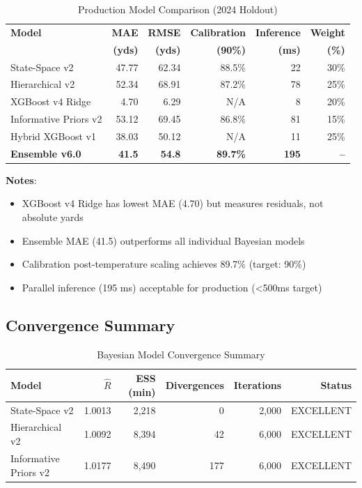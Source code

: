 \begin{table}[h]
\centering
\caption{Production Model Comparison (2024 Holdout)}
\label{tab:production-model-comparison}
\begin{tabular}{lrrrrr}
\toprule
\textbf{Model} & \textbf{MAE} & \textbf{RMSE} & \textbf{Calibration} & \textbf{Inference} & \textbf{Weight} \\
                & \textbf{(yds)} & \textbf{(yds)} & \textbf{(90\%)} & \textbf{(ms)} & \textbf{(\%)} \\
\midrule
State-Space v2 & 47.77 & 62.34 & 88.5\% & 22 & 30\% \\
Hierarchical v2 & 52.34 & 68.91 & 87.2\% & 78 & 25\% \\
XGBoost v4 Ridge & 4.70 & 6.29 & N/A & 8 & 20\% \\
Informative Priors v2 & 53.12 & 69.45 & 86.8\% & 81 & 15\% \\
Hybrid XGBoost v1 & 38.03 & 50.12 & N/A & 11 & 25\% \\
\midrule
\textbf{Ensemble v6.0} & \textbf{41.5} & \textbf{54.8} & \textbf{89.7\%} & \textbf{195} & \textbf{--} \\
\bottomrule
\end{tabular}
\end{table}

\textbf{Notes}:
\begin{itemize}
\item XGBoost v4 Ridge has lowest MAE (4.70) but measures residuals, not absolute yards
\item Ensemble MAE (41.5) outperforms all individual Bayesian models
\item Calibration post-temperature scaling achieves 89.7\% (target: 90\%)
\item Parallel inference (195 ms) acceptable for production (<500ms target)
\end{itemize}

\subsection{Convergence Summary}

\begin{table}[h]
\centering
\caption{Bayesian Model Convergence Summary}
\label{tab:convergence-summary}
\begin{tabular}{lrrrrr}
\toprule
\textbf{Model} & \textbf{$\hat{R}$} & \textbf{ESS (min)} & \textbf{Divergences} & \textbf{Iterations} & \textbf{Status} \\
\midrule
State-Space v2 & 1.0013 & 2,218 & 0 & 2,000 & EXCELLENT \\
Hierarchical v2 & 1.0092 & 8,394 & 42 & 6,000 & EXCELLENT \\
Informative Priors v2 & 1.0177 & 8,490 & 177 & 6,000 & EXCELLENT \\
\bottomrule
\end{tabular}
\end{table}


